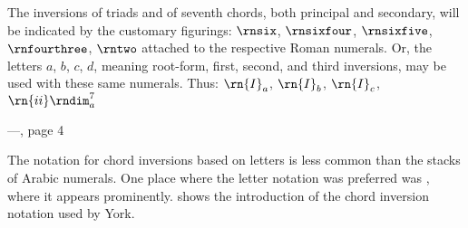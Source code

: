 \begin{italicquotes}
    The inversions of triads and of seventh chords, both
    principal and secondary, will be indicated by the
    customary figurings: $\rnsix$, $\rnsixfour$,
    $\rnsixfive$, $\rnfourthree$, $\rntwo$ attached to the
    respective Roman numerals. Or, the letters $a$, $b$,
    $c$, $d$, meaning root-form, first, second, and third
    inversions, may be used with these same numerals. Thus:
    $\rn{I}_a$, $\rn{I}_b$, $\rn{I}_c$, $\rn{ii}\rndim^7_a$

    ---\textcite{cutter1902harmonic}, page 4
\end{italicquotes}



The notation for chord inversions based on letters is less
common than the stacks of Arabic numerals. One place where
the letter notation was preferred was
\textcite{york1909practical}, where it appears prominently.
 shows the
introduction of the chord inversion notation used by York.
